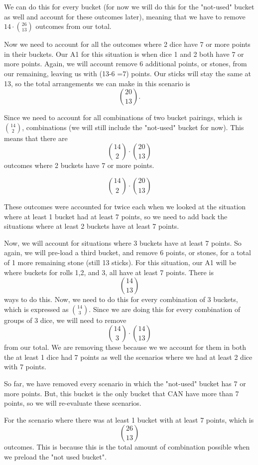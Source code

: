 \documentclass{article}
\begin{document}
We can do this for every bucket (for now we will do this for the "not-used" bucket as well and account for these outcomes later), meaning that we have to remove  
$14 \cdot \binom{26}{13}$ outcomes from our total. 

Now we need to account for all the outcomes where 2 dice have 7 or more points in their buckets. Our A1 for this situation is when dice 1 and 2 both have 7 or more points. Again, we will account remove 6 additional points, or stones, from our remaining, leaving us with (13-6 =7) points. Our sticks will stay the same at 13, so the total arrangements we can make in this scenario is  
$$\binom{20}{13}.$$  

Since we need to account for all combinations of two bucket pairings, which is  
$\binom{14}{2}$,  
combinations (we will still include the "not-used" bucket for now). This means that there are  
$$\binom{14}{2} \cdot \binom{20}{13}$$  
outcomes where 2 buckets have 7 or more points.  

$$\binom{14}{2} \cdot \binom{20}{13}$$

These outcomes were accounted for twice each when we looked at the situation where at least 1 bucket had at least 7 points, so we need to add back the situations where at least 2 buckets have at least 7 points.

Now, we will account for situations where 3 buckets have at least 7 points. So again, we will pre-load a third bucket, and remove 6 points, or stones, for a total of 1 more remaining stone (still 13 sticks). For this situation, our A1 will be where buckets for rolls 1,2, and 3, all have at least 7 points. There is  
$$\binom{14}{13}$$  
ways to do this. Now, we need to do this for every combination of 3 buckets, which is expressed as  
$\binom{14}{3}$. Since we are doing this for every combination of groups of 3 dice, we will need to remove  
$$\binom{14}{3} \cdot \binom{14}{13}$$  
from our total. We are removing these because we we account for them in both the at least 1 dice had 7 points as well the scenarios where we had at least 2 dice with 7 points. 

So far, we have removed every scenario in which the "not-used" bucket has 7 or more points. But, this bucket is the only bucket that CAN have more than 7 points, so we will re-evaluate these scenarios. 

For the scenario where there was at least 1 bucket with at least 7 points, which is  
$$\binom{26}{13}$$  
outcomes. This is because this is the total amount of combination possible when we preload the "not used bucket".
\end{document}
